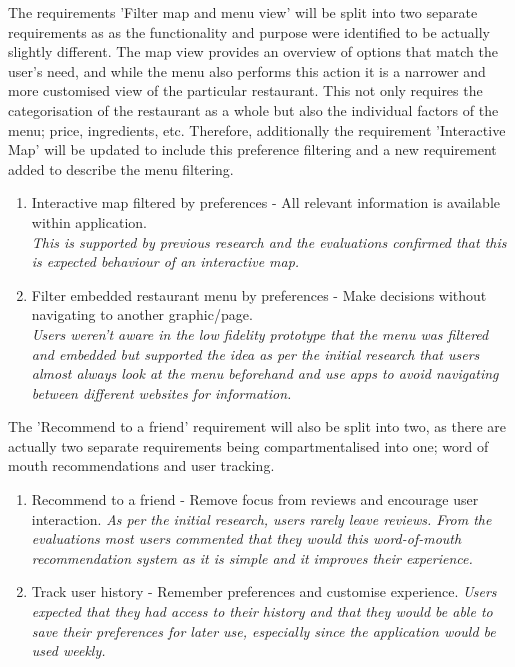 \documentclass[a4 paper, 12pt]{article}
\begin{document}
    The requirements 'Filter map and menu view' will be split into two separate requirements as as the functionality and purpose were identified to be actually slightly different. The map view provides an overview of options that match the user's need, and while the menu also performs this action it is a narrower and more customised view of the particular restaurant. This not only requires the categorisation of the restaurant as a whole but also the individual factors of the menu; price, ingredients, etc. Therefore, additionally the requirement 'Interactive Map' will be updated to include this preference filtering and a new requirement added to describe the menu filtering.
        \begin{enumerate}[resume]
            \item Interactive map filtered by preferences - All relevant information is available within application. \\
                \textit{This is supported by previous research and the evaluations confirmed that this is expected behaviour of an interactive map.}
            \item Filter embedded restaurant menu by preferences - Make decisions without navigating to another graphic/page. \\
                \textit{Users weren't aware in the low fidelity prototype that the menu was filtered and embedded but supported the idea as per the initial research that users almost always look at the menu beforehand and use apps to avoid navigating between different websites for information.}
        \end{enumerate}

    The 'Recommend to a friend' requirement will also be split into two, as there are actually two separate requirements being compartmentalised into one; word of mouth recommendations and user tracking. 
        \begin{enumerate}[resume]
            \item Recommend to a friend - Remove focus from reviews and encourage user interaction. 
                \textit{As per the initial research, users rarely leave reviews. From the evaluations most users commented that they would this word-of-mouth recommendation system as it is simple and it improves their experience.}
            \item Track user history - Remember preferences and customise experience. 
                \textit{Users expected that they had access to their history and that they would be able to save their preferences for later use, especially since the application would be used weekly.}
        \end{enumerate}
 
\end{document}
